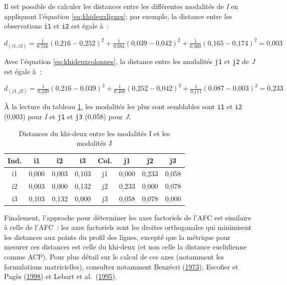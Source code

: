 \documentclass[
  11pt,
  french,
]{book}
\begin{document}
Il est possible de calculer les distances entre les différentes modalités de \emph{I} en appliquant l'équation \eqref{eq:khideuxlignes}; par exemple, la distance entre les observations \texttt{i1} et \texttt{i2} est égale à~:

\(d_{(i1,i2)}=\frac{\mbox{1}}{\mbox{0,556}}(\mbox{0,216}-\mbox{0,252})^2+\frac{\mbox{1}}{\mbox{0,084}}(\mbox{0,039}-\mbox{0,042})^2+ \frac{\mbox{1}}{\mbox{0,360}}(\mbox{0,165}-\mbox{0,174})^2=\mbox{0,003}\)

Avec l'équation \eqref{eq:khideuxcolonnes}, la distance entre les modalités \texttt{j1} et \texttt{j2} de \emph{J} est égale à~:

\(d_{(j1,j2)}=\frac{\mbox{1}}{\mbox{0,420}}(\mbox{0,216}-\mbox{0,039})^2+ \frac{\mbox{1}}{\mbox{0,468}}(\mbox{0,252}-\mbox{0,042})^2 + \frac{\mbox{1}}{\mbox{0,111}}(\mbox{0,087}-\mbox{0,003})^2=\mbox{0,233}\)

À la lecture du tableau \ref{tab:MatriceDistKhi}, les modalités les plus sont semblables sont
\texttt{i1} et \texttt{i2} (0,003) pour \emph{I} et \texttt{j1} et \texttt{j3} (0,058) pour \emph{J}.

\begin{table}

\caption{\label{tab:MatriceDistKhi}Distances du khi-deux entre les modalités I et les modalités J}
\centering
\fontsize{8}{10}\selectfont
\begin{tabular}[t]{cccccccc}
\toprule
Ind. & i1 & i2 & i3 & Col. & j1 & j2 & j3\\
\midrule
i1 & 0,000 & 0,003 & 0,103 & j1 & 0,000 & 0,233 & 0,058\\
i2 & 0,003 & 0,000 & 0,132 & j2 & 0,233 & 0,000 & 0,078\\
i3 & 0,103 & 0,132 & 0,000 & j3 & 0,058 & 0,078 & 0,000\\
\bottomrule
\end{tabular}
\end{table}

Finalement, l'approche pour déterminer les axes factoriels de l'AFC est similaire à celle de l'AFC~: les axes factoriels sont les droites orthogonales qui minimisent les distances aux points du profil des lignes, excepté que la métrique pour mesurer ces distances est celle du khi-deux (et non celle la distance euclidienne comme ACP). Pour plus détail sur le calcul de ces axes (notamment les formulations matricielles), consultez notamment Benzécri (\protect\hyperlink{ref-benzecri1973analyse}{1973}), Escofier et Pagès (\protect\hyperlink{ref-escofier1998analyses}{1998}) et Lebart et al.~(\protect\hyperlink{ref-lebart1995statistique}{1995}).
\end{document}
